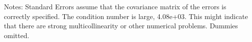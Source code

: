 Notes: \newline
 [1] Standard Errors assume that the covariance matrix of the errors is correctly specified. \newline
 [2] The condition number is large, 4.08e+03. This might indicate that there are \newline
 strong multicollinearity or other numerical problems. Dummies omitted.
